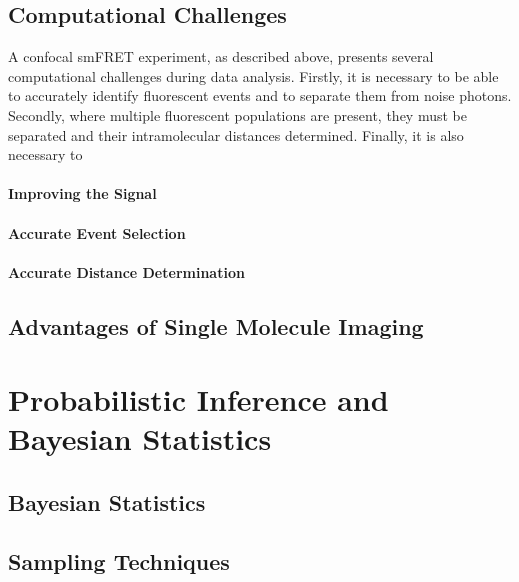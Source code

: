 \subsection{Computational Challenges}
A confocal smFRET experiment, as described above, presents several computational challenges during data analysis. Firstly, it is necessary to be able to accurately identify fluorescent events and to separate them from noise photons. Secondly, where multiple fluorescent populations are present, they must be separated and their intramolecular distances determined. Finally, it is also necessary to 

\paragraph{Improving the Signal}
\paragraph{Accurate Event Selection}
\paragraph{Accurate Distance Determination}

\subsection{Advantages of Single Molecule Imaging}





\section{Probabilistic Inference and Bayesian Statistics}
\subsection{Bayesian Statistics}
\subsection{Sampling Techniques}
